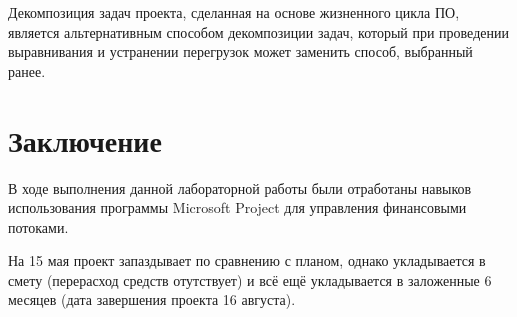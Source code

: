 Декомпозиция задач проекта, сделанная на основе жизненного цикла ПО, является альтернативным способом декомпозиции задач, который при проведении выравнивания и устранении перегрузок может заменить способ, выбранный ранее.

\section*{Заключение}

В ходе выполнения данной лабораторной работы были отработаны навыков использования программы Microsoft Project для управления финансовыми потоками.

На 15 мая проект запаздывает по сравнению с планом, однако укладывается в смету (перерасход средств отутствует) и всё ещё укладывается в заложенные 6 месяцев (дата завершения проекта 16 августа).